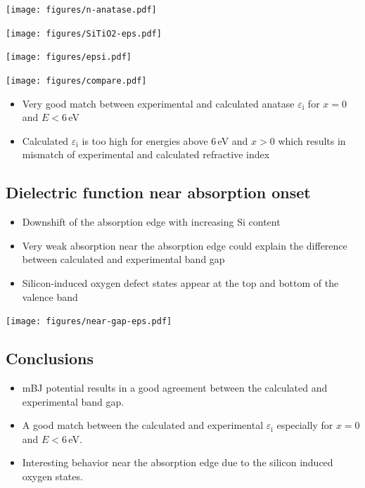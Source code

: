 \documentclass[blues]{poster}
\let\eps=\varepsilon
\begin{document}
\begin{multicols}{2}
\begin{minipage}{0.4\linewidth}
\end{minipage}
\begin{minipage}{0.6\linewidth}   
\texttt{[image: figures/n-anatase.pdf]}
\end{minipage}

\texttt{[image: figures/SiTiO2-eps.pdf]}

\texttt{[image: figures/epsi.pdf]}

\texttt{[image: figures/compare.pdf]}

\begin{itemize}
\item{Very good match between experimental and calculated anatase $\eps_\mathrm{i}$ for $x = 0$ and $E < 6$\,eV}
\item{Calculated $\eps_\mathrm{i}$ is too high for energies above 6\,eV and $x > 0$ which results in mismatch of experimental and calculated refractive index}
\end{itemize}

\subsection{Dielectric function near absorption onset}

\begin{minipage}{0.5\linewidth}   

\begin{itemize}
\item{Downshift of the absorption edge with increasing Si content}
\item{Very weak absorption near the absorption edge could explain the difference between calculated and experimental band gap}
\item{Silicon-induced oxygen defect states appear at the top and bottom of the valence band}
\end{itemize}

\end{minipage}
\begin{minipage}{0.5\linewidth}
\texttt{[image: figures/near-gap-eps.pdf]}
\end{minipage}

\vspace{-0.5cm}
\subsection{Conclusions}
\begin{itemize}
\item{mBJ potential results in a good agreement between the calculated and experimental band gap.}
\item{A good match between the calculated and experimental $\eps_\mathrm{i}$ especially for $x = 0$ and $E < 6$\,eV.}
\item{Interesting behavior near the absorption edge due to the silicon induced oxygen states.}
\end{itemize}


\end{multicols}
\end{document}
